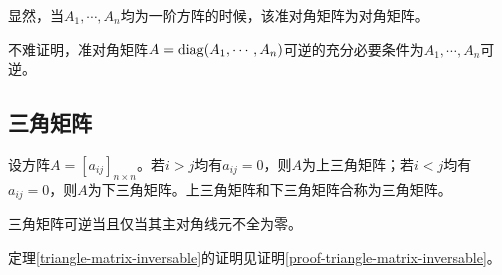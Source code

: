 \begin{remark}
    显然，当$A_1,\cdots,A_n$均为一阶方阵的时候，该准对角矩阵为对角矩阵。
\end{remark}

\begin{remark}
    不难证明，准对角矩阵$A=\mathrm{diag}(A_1,\cdots,A_n)$可逆的充分必要条件为$A_1,\cdots,A_n$可逆。
\end{remark}

\subsection{三角矩阵}

\begin{definition}
    \label{triangle-matrix}
    设方阵$A=[a_{ij}]_{n\times n}$。若$i>j$均有$a_{ij}=0$，则$A$为上三角矩阵；若$i<j$均有$a_{ij}=0$，则$A$为下三角矩阵。上三角矩阵和下三角矩阵合称为三角矩阵。
\end{definition}

\begin{thm}
    \label{triangle-matrix-inversable}
    三角矩阵可逆当且仅当其主对角线元不全为零。
\end{thm}

定理\ref{triangle-matrix-inversable}的证明见证明\ref{proof-triangle-matrix-inversable}。

